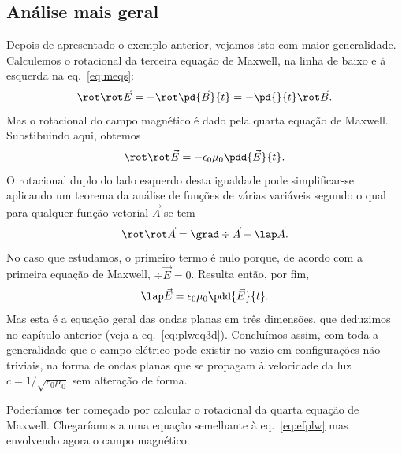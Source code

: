 \subsection{Análise mais geral}
Depois de apresentado o exemplo anterior, vejamos isto com maior generalidade.
Calculemos o rotacional da terceira equação de Maxwell, na linha de baixo e à
esquerda na eq.~\eqref{eq:meqs}:
\begin{equation*}
  \rot\rot\vec E=-\rot\pd{\vec B}{t}=-\pd{}{t}\rot\vec B.
\end{equation*}
Mas o rotacional do campo magnético é dado pela quarta equação de Maxwell.
Substibuindo aqui, obtemos
\begin{equation*}
  \rot\rot\vec E=-\epsilon_0\mu_0\pdd{\vec E}{t}.
\end{equation*}
O rotacional duplo do lado esquerdo desta igualdade pode simplificar-se
aplicando um teorema da análise de funções de várias variáveis segundo o qual
para qualquer função vetorial $\vec A$ se tem
\begin{equation*}
  \rot\rot\vec A=\grad\div\vec A - \lap\vec A.
\end{equation*}
No caso que estudamos, o primeiro termo é nulo porque, de acordo com a primeira
equação de Maxwell, $\div \vec E=0$. Resulta então, por fim,
\begin{equation}\label{eq:efplw}
  \lap\vec E=\epsilon_0\mu_0\pdd{\vec E}{t}.
\end{equation}
Mas esta é a equação geral das ondas planas em três dimensões, que deduzimos no
capítulo anterior (veja a eq.~\eqref{eq:plweq3d}). Concluímos assim, com toda a
generalidade que o campo elétrico pode existir no vazio em configurações não
triviais, na forma de ondas planas que se propagam à velocidade da luz
$c=1/\sqrt{\epsilon_0\mu_0}$ sem alteração de forma.

Poderíamos ter começado por calcular o rotacional da quarta equação de Maxwell.
Chegaríamos a uma equação semelhante à eq.~\eqref{eq:efplw} mas envolvendo agora
o campo magnético.

